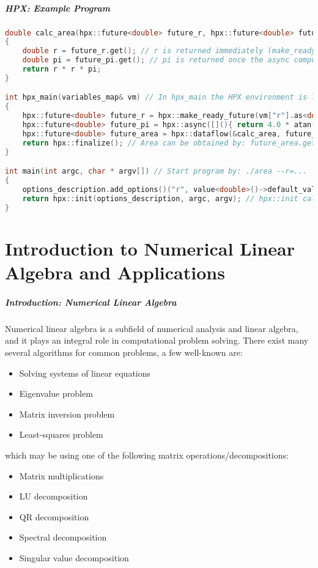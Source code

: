 \begin{frame}[fragile]
\frametitle{HPX: Example Program}
\begin{lstlisting}[language=C++]
double calc_area(hpx::future<double> future_r, hpx::future<double> future_pi)
{
    double r = future_r.get(); // r is returned immediately (make_ready_future)
    double pi = future_pi.get(); // pi is returned once the async computation finishes
    return r * r * pi;
}

int hpx_main(variables_map& vm) // In hpx_main the HPX environment is loaded
{
    hpx::future<double> future_r = hpx::make_ready_future(vm["r"].as<double>());
    hpx::future<double> future_pi = hpx::async([](){ return 4.0 * atan(1.0); });
    hpx::future<double> future_area = hpx::dataflow(&calc_area, future_r, future_pi);
    return hpx::finalize(); // Area can be obtained by: future_area.get()
}

int main(int argc, char * argv[]) // Start program by: ./area --r=...
{
    options_description.add_options()("r", value<double>()->default_value(1.0), "Radius: r");
    return hpx::init(options_description, argc, argv); // hpx::init calls hpx_main
}
\end{lstlisting}
\end{frame}

\part{Introduction to Numerical Linear Algebra and Applications}
\makepart

\begin{frame}
\frametitle{Introduction: Numerical Linear Algebra}
Numerical linear algebra is a subfield of numerical analysis and linear algebra,
and it plays an integral role in computational problem solving.
There exist many several algorithms for common problems, a few well-known are:
\begin{itemize}
 \item Solving systems of linear equations
 \item Eigenvalue problem
 \item Matrix inversion problem
 \item Least-squares problem
\end{itemize}
which may be using one of the following matrix operations/decompositions:
\begin{itemize}
 \item Matrix multiplications
 \item LU decomposition
 \item QR decomposition
 \item Spectral decomposition
 \item Singular value decomposition
\end{itemize}
\end{frame}

